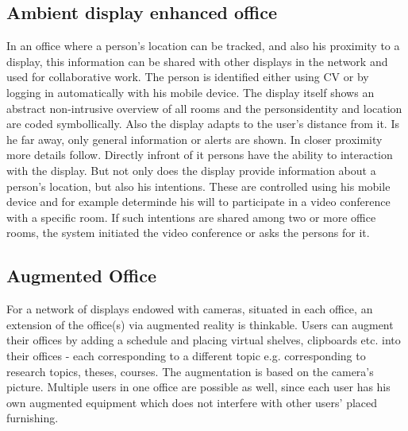 
\subsection{Ambient display enhanced office}
In an office where a person’s location can be tracked, and also his proximity to a display, this information can be shared with other displays in the network and used for collaborative work.
The person is identified either using CV or by logging in automatically with his mobile device.
The display itself shows an abstract non-intrusive overview of all rooms and the personsidentity and location are coded symbollically.
Also the display adapts to the user’s distance from it.
Is he far away, only general information or alerts are shown.
In closer proximity more details follow. Directly infront of it persons have the ability to interaction with the display.
But not only does the display provide information about a person’s location, but also his intentions.
These are controlled using his mobile device and for example determinde his will to participate in a video conference with a specific room.
If such intentions are shared among two or more office rooms, the system initiated the video conference or asks the persons for it.

\subsection{Augmented Office}
For a network of displays endowed with cameras, situated in each office, an extension of the office(s) via augmented reality is thinkable.
Users can augment their offices by adding a schedule and placing virtual shelves, clipboards etc. into their offices - each corresponding to a different topic e.g. corresponding to research topics, theses, courses.
The augmentation is based on the camera's picture.
Multiple users in one office are possible as well, since each user has his own augmented equipment which does not interfere with other users' placed furnishing.

